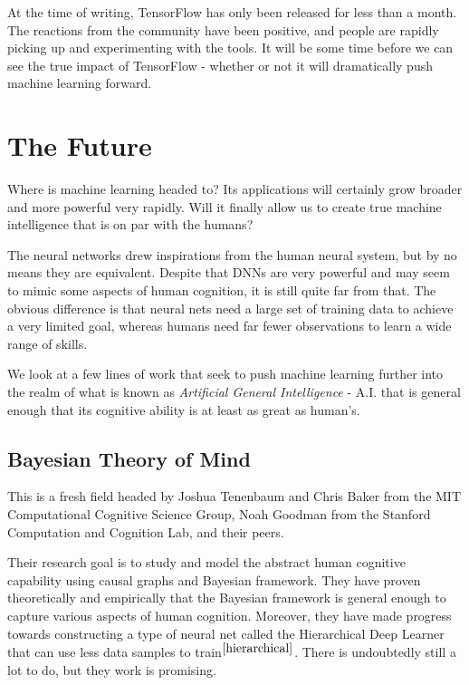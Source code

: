 \documentclass[12pt]{article}  %
\begin{document}
At the time of writing, TensorFlow has only been released for less than a month. The reactions from the community have been positive, and people are rapidly picking up and experimenting with the tools. It will be some time before we can see the true impact of TensorFlow - whether or not it will dramatically push machine learning forward.







\section{The Future}

Where is machine learning headed to? Its applications will certainly grow broader and more powerful very rapidly. Will it finally allow us to create true machine intelligence that is on par with the humans?

The neural networks drew inspirations from the human neural system, but by no means they are equivalent. Despite that DNNs are very powerful and may seem to mimic some aspects of human cognition, it is still quite far from that. The obvious difference is that neural nets need a large set of training data to achieve a very limited goal, whereas humans need far fewer observations to learn a wide range of skills.

We look at a few lines of work that seek to push machine learning further into the realm of what is known as \emph{Artificial General Intelligence} - A.I. that is general enough that its cognitive ability is at least as great as human's.


\subsection{Bayesian Theory of Mind}

This is a fresh field headed by Joshua Tenenbaum and Chris Baker from the MIT Computational Cognitive Science Group, Noah Goodman from the Stanford Computation and Cognition Lab, and their peers.

Their research goal is to study and model the abstract human cognitive capability using causal graphs and Bayesian framework. They have proven theoretically and empirically that the Bayesian framework is general enough to capture various aspects of human cognition. Moreover, they have made progress towards constructing a type of neural net called the Hierarchical Deep Learner that can use less data samples to train$^{\ref{hierarchical}}$. There is undoubtedly still a lot to do, but they work is promising.
\end{document}
